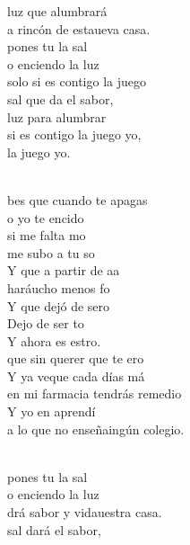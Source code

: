 \begin{cancion}
\begin{chorus}
	luz que alumbrará\\
	a rincón de estaueva casa.\\
	 pones tu la sal \\
	o enciendo la luz\\
	 solo si es contigo  la juego\\
	 sal que da el sabor, \\
	luz para alumbrar\\
	 si es contigo  la juego yo,\\
	 la juego yo.\\
	\end{chorus}%
	\jump\\
	bes que cuando te apagas \\
	o yo te encido\\
	 si me falta mo \\
	me subo a tu so\\
	Y  que a partir de aa \\
	haráucho menos fo \\
	Y  que dejó de sero \\
	Dejo de ser to\\
	Y ahora es estro.\\
	 que sin querer que te ero\\
	Y ya veque cada días má\\
	 en mi farmacia tendrás remedio\\
	Y yo en  aprendí \\
	a lo que no enseñaingún colegio.\\\jump\\
	\begin{chorus}%
	 pones tu la sal \\
	o enciendo la luz\\
	drá sabor y vidauestra casa.\\
	 sal dará el sabor, \\

\end{chorus}
\end{cancion}
